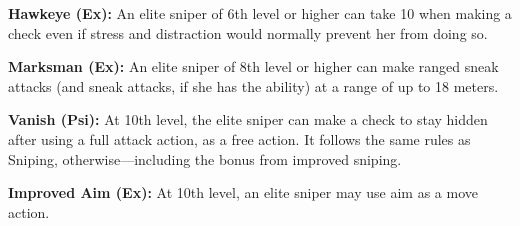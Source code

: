 {\textbf{Hawkeye (Ex):} An elite sniper of 6th level or higher can take 10 when making a  check even if stress and distraction would normally prevent her from doing so.

\textbf{Marksman (Ex):} An elite sniper of 8th level or higher can make ranged sneak attacks (and sneak attacks, if she has the ability) at a range of up to 18 meters.

\textbf{Vanish (Psi):} At 10th level, the elite sniper can make a  check to stay hidden after using a full attack action, as a free action. It follows the same rules as Sniping, otherwise---including the bonus from improved sniping.

\textbf{Improved Aim (Ex):} At 10th level, an elite sniper may use aim as a move action.
}
